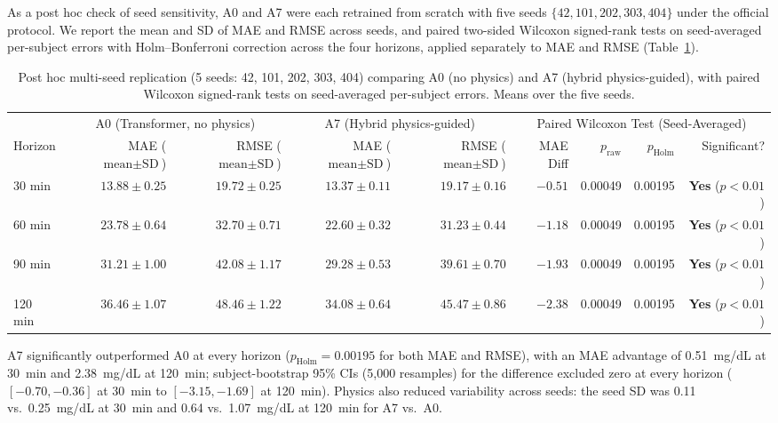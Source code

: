 \documentclass[journal]{IEEEtran}
\begin{document}
As a post hoc check of seed sensitivity, A0 and A7 were each retrained from scratch with five seeds $\{42, 101, 202, 303, 404\}$ under the official protocol. We report the mean and SD of MAE and RMSE across seeds, and paired two-sided Wilcoxon signed-rank tests on seed-averaged per-subject errors with Holm--Bonferroni correction across the four horizons, applied separately to MAE and RMSE (Table~\ref{tab:multiseed}).

\begin{table}[t]
\centering
\caption{Post hoc multi-seed replication (5 seeds: 42, 101, 202, 303, 404) comparing A0 (no physics) and A7 (hybrid physics-guided), with paired Wilcoxon signed-rank tests on seed-averaged per-subject errors. Means over the five seeds.}
\label{tab:multiseed}
\footnotesize
\setlength{\tabcolsep}{4.5pt}
\begin{tabular}{lrrrrrrrr}
\toprule
& \multicolumn{2}{c}{A0 (Transformer, no physics)} & \multicolumn{2}{c}{A7 (Hybrid physics-guided)} & \multicolumn{4}{c}{Paired Wilcoxon Test (Seed-Averaged)} \\
\cmidrule(lr){2-3} \cmidrule(lr){4-5} \cmidrule(lr){6-9}
Horizon & MAE ($\text{mean}\pm\text{SD}$) & RMSE ($\text{mean}\pm\text{SD}$) & MAE ($\text{mean}\pm\text{SD}$) & RMSE ($\text{mean}\pm\text{SD}$) & MAE Diff & $p_{\text{raw}}$ & $p_{\text{Holm}}$ & Significant? \\
\midrule
30 min & $13.88 \pm 0.25$ & $19.72 \pm 0.25$ & $\mathbf{13.37 \pm 0.11}$ & $\mathbf{19.17 \pm 0.16}$ & $-0.51$ & 0.00049 & 0.00195 & \textbf{Yes} ($p < 0.01$) \\
60 min & $23.78 \pm 0.64$ & $32.70 \pm 0.71$ & $\mathbf{22.60 \pm 0.32}$ & $\mathbf{31.23 \pm 0.44}$ & $-1.18$ & 0.00049 & 0.00195 & \textbf{Yes} ($p < 0.01$) \\
90 min & $31.21 \pm 1.00$ & $42.08 \pm 1.17$ & $\mathbf{29.28 \pm 0.53}$ & $\mathbf{39.61 \pm 0.70}$ & $-1.93$ & 0.00049 & 0.00195 & \textbf{Yes} ($p < 0.01$) \\
120 min & $36.46 \pm 1.07$ & $48.46 \pm 1.22$ & $\mathbf{34.08 \pm 0.64}$ & $\mathbf{45.47 \pm 0.86}$ & $-2.38$ & 0.00049 & 0.00195 & \textbf{Yes} ($p < 0.01$) \\
\bottomrule
\end{tabular}
\end{table}

A7 significantly outperformed A0 at every horizon ($p_{\text{Holm}} = 0.00195$ for both MAE and RMSE), with an MAE advantage of 0.51~mg/dL at 30~min and 2.38~mg/dL at 120~min; subject-bootstrap 95\% CIs (5,000 resamples) for the difference excluded zero at every horizon ($[-0.70, -0.36]$ at 30~min to $[-3.15, -1.69]$ at 120~min). Physics also reduced variability across seeds: the seed SD was 0.11 vs.\ 0.25~mg/dL at 30~min and 0.64 vs.\ 1.07~mg/dL at 120~min for A7 vs.\ A0.
\end{document}
